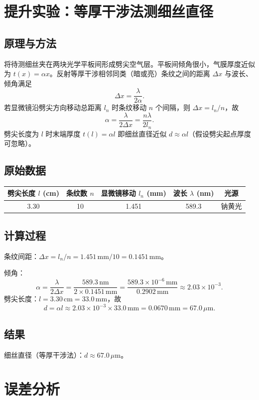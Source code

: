 \documentclass[12pt,a4paper]{article}
\begin{document}
\section{提升实验：等厚干涉法测细丝直径}
\subsection*{原理与方法}
将待测细丝夹在两块光学平板间形成劈尖空气层。平板间倾角很小，气膜厚度近似为 $t(x)=\alpha x$。反射等厚干涉相邻同类（暗或亮）条纹之间的距离 $\Delta x$ 与波长、倾角满足
\[\Delta x = \frac{\lambda}{2\alpha}.\]
若显微镜沿劈尖方向移动总距离 $l_n$ 时条纹移动 $n$ 个间隔，则 $\Delta x = l_n/n$，故
\[\alpha = \frac{\lambda}{2\Delta x} = \frac{n\lambda}{2 l_n}.\]
劈尖长度为 $l$ 时末端厚度 $t(l)=\alpha l$ 即细丝直径近似 $d\approx \alpha l$（假设劈尖起点厚度可忽略）。

\subsection*{原始数据}
\begin{center}
\begin{tabular}{ccccc}
\toprule
劈尖长度 $l$ (cm) & 条纹数 $n$ & 显微镜移动 $l_n$ (mm) & 波长 $\lambda$ (nm) & 光源 \\
\midrule
3.30 & 10 & 1.451 & 589.3 & 钠黄光 \\
\bottomrule
\end{tabular}
\end{center}

\subsection*{计算过程}
条纹间距：$\Delta x = l_n/n = 1.451\,\text{mm}/10 = 0.1451\,\text{mm}$。\par
倾角：
\[\alpha = \frac{\lambda}{2\Delta x} = \frac{589.3\,\text{nm}}{2\times 0.1451\,\text{mm}} = \frac{589.3\times10^{-6}\,\text{mm}}{0.2902\,\text{mm}} \approx 2.03\times10^{-3}.\]
劈尖长度：$l=3.30\,\text{cm}=33.0\,\text{mm}$，故
\[ d = \alpha l \approx 2.03\times10^{-3}\times 33.0\,\text{mm} = 0.0670\,\text{mm} = 67.0\,\mu\text{m}. \]

\subsection*{结果}
细丝直径（等厚干涉法）：$d \approx 67.0\,\mu\text{m}$。
\section{误差分析}
\end{document}
